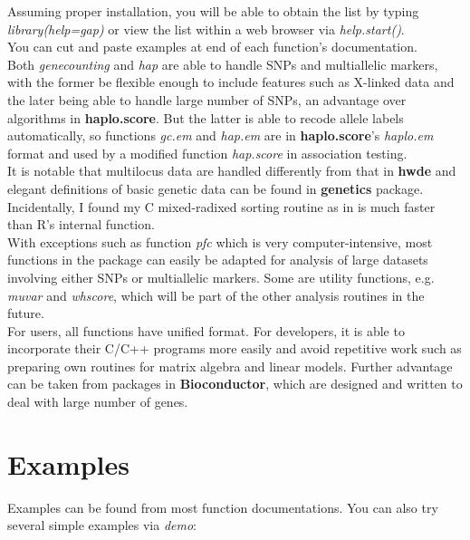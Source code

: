 \documentclass[11pt,a4paper]{article}
\begin{document}
Assuming proper installation, you will be able to obtain the list by typing
\textit{library(help=gap)} or view the list within a web browser via 
\textit{help.start()}.\\

You can cut and paste examples at end of each function's documentation.\\

Both \textit{genecounting} and \textit{hap} are able to handle SNPs and multiallelic
markers, with the former be flexible enough to include features such as X-linked data
and the later being able to handle large number of SNPs, an
advantage over algorithms in {\bf haplo.score}. But the latter is able to recode
allele labels automatically, so functions \textit{gc.em} and \textit{hap.em}
are in {\bf haplo.score}'s \textit{haplo.em} format and used by a modified function
\textit{hap.score} in association testing.\\

It is notable that multilocus data are handled differently from that in {\bf hwde} and
elegant definitions of basic genetic data can be found in {\bf genetics} package.\\

Incidentally, I found my C mixed-radixed sorting routine as in \cite{zhao03} is much
faster than R's internal function.\\

With exceptions such as function \textit{pfc} which is very computer-intensive, most
functions in the package can easily be adapted for analysis of large datasets involving
either SNPs or multiallelic markers. Some are utility functions, e.g. \textit{muvar}
and \textit{whscore}, which will be part of the other analysis routines in the future.\\

For users, all functions have unified format. For developers, it is able to incorporate
their C/C++ programs more easily and avoid repetitive work such as preparing own routines
for matrix algebra and linear models. Further advantage can be taken from packages in
{\bf Bioconductor}, which are designed and written to deal with large number of genes.


\section{Examples}

Examples can be found from most function documentations. You can also try several simple
examples via \textit{demo}:
\end{document}
